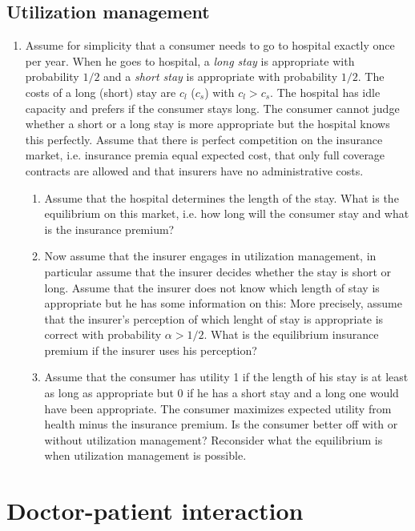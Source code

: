 \documentclass[a4paper]{article}
\begin{document}
\subsection{Utilization management}
\label{sec:orge6b3acd}
\begin{enumerate}[resume]
\item Assume for simplicity that a consumer needs to go to hospital exactly once per year. When he goes to hospital, a \emph{long stay} is appropriate with probability \(1/2\) and a \emph{short stay} is appropriate with probability \(1/2\). The costs of a long (short) stay are \(c_l\) (\(c_s\)) with \(c_l>c_s\). The hospital has idle capacity and prefers if the consumer stays long. The consumer cannot judge whether a short or a long stay is more appropriate but the hospital knows this perfectly. Assume that there is perfect competition on the insurance market, i.e. insurance premia equal expected cost, that only full coverage contracts are allowed and that insurers have no administrative costs. 
\begin{enumerate}
\item Assume that the hospital determines the length of the stay. What is the equilibrium on this market, i.e. how long will the consumer stay and what is the insurance premium?
\item Now assume that the insurer engages in utilization management, in particular assume that the insurer decides whether the stay is short or long. Assume that the insurer does not know which length of stay is appropriate but he has some information on this: More precisely, assume that the insurer's perception of which lenght of stay is appropriate is correct with probability \(\alpha>1/2\). What is the equilibrium insurance premium if the insurer uses his perception?
\item Assume that the consumer has utility 1 if the length of his stay is at least as long as appropriate but 0 if he has a short stay and a long one would have been appropriate. The consumer maximizes expected utility from health minus the insurance premium. Is the consumer better off with or without utilization management? Reconsider what the equilibrium is when utilization management is possible.
\end{enumerate}
\end{enumerate}


\section{Doctor-patient interaction}
\label{sec:org8b973cb}
\end{document}
